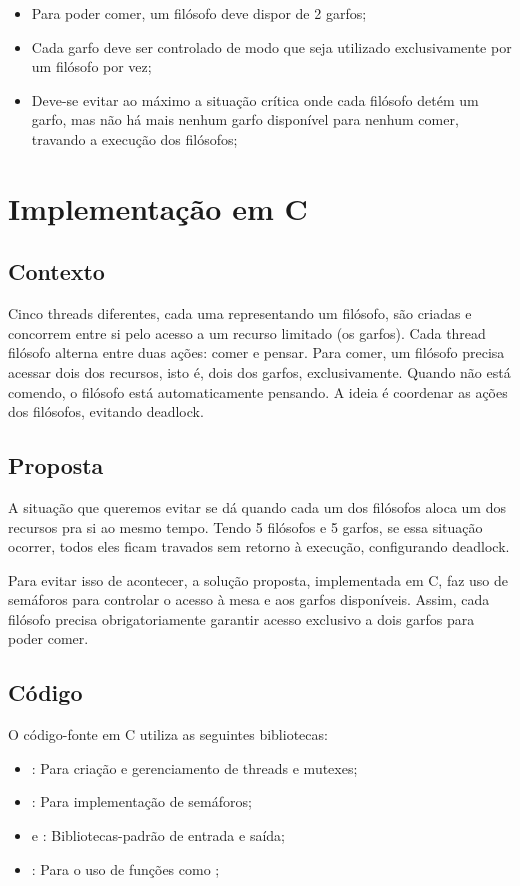 \documentclass[
	12pt,				%
	openright,			%
	oneside,			%
	a4paper,			%
	chapter=TITLE,		%
	english,			%
	french,				%
	spanish,			%
	brazil				%
	]{abntex2}
\theoremstyle{definition}
\begin{document}
\begin{itemize}
    \item Para poder comer, um filósofo deve dispor de 2 garfos;
    \item Cada garfo deve ser controlado de modo que seja utilizado exclusivamente por um filósofo por vez;
    \item Deve-se evitar ao máximo a situação crítica onde cada filósofo detém um garfo, mas não há mais nenhum garfo disponível para nenhum comer, travando a execução dos filósofos;
\end{itemize}

\section{Implementação em C}
\subsection{Contexto}
Cinco threads diferentes, cada uma representando um filósofo, são criadas e concorrem entre si pelo acesso a um recurso limitado (os garfos). Cada thread filósofo alterna entre duas ações: comer e pensar. Para comer, um filósofo precisa acessar dois dos recursos, isto é, dois dos garfos, exclusivamente. Quando não está comendo, o filósofo está automaticamente pensando. A ideia é coordenar as ações dos filósofos, evitando deadlock.
\subsection{Proposta}
A situação que queremos evitar se dá quando cada um dos filósofos aloca um dos recursos pra si ao mesmo tempo. Tendo 5 filósofos e 5 garfos, se essa situação ocorrer, todos eles ficam travados sem retorno à execução, configurando deadlock. 

Para evitar isso de acontecer, a solução proposta, implementada em C, faz uso de semáforos para controlar o acesso à mesa e aos garfos disponíveis. Assim, cada filósofo precisa obrigatoriamente garantir acesso exclusivo a dois garfos para poder comer.
\subsection{Código}

O código-fonte em C utiliza as seguintes bibliotecas:
\begin{itemize}
    \item \textbf{}: Para criação e gerenciamento de threads e mutexes;
    \item \textbf{}: Para implementação de semáforos;
    \item \textbf{} e \textbf{}: Bibliotecas-padrão de entrada e saída;
    \item \textbf{}: Para o uso de funções como ;
\end{itemize}
\end{document}
